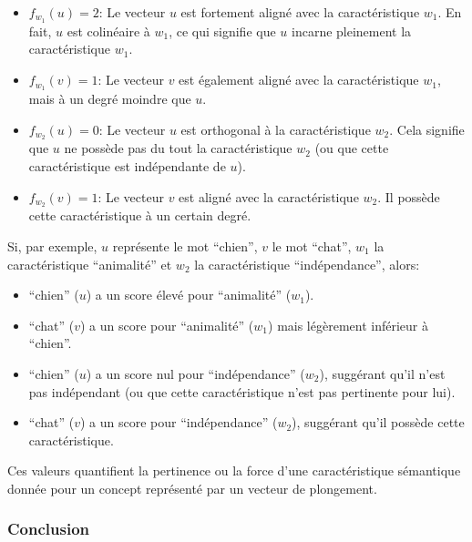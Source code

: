 \documentclass[11pt,a4paper]{report}
\begin{document}
\begin{enumerate}
  \begin{itemize}

  \item
    \(f_{w_1}(u) = 2\): Le vecteur \(u\) est fortement aligné avec la
    caractéristique \(w_1\). En fait, \(u\) est colinéaire à \(w_1\), ce
    qui signifie que \(u\) incarne pleinement la caractéristique
    \(w_1\).
  \item
    \(f_{w_1}(v) = 1\): Le vecteur \(v\) est également aligné avec la
    caractéristique \(w_1\), mais à un degré moindre que \(u\).
  \item
    \(f_{w_2}(u) = 0\): Le vecteur \(u\) est orthogonal à la
    caractéristique \(w_2\). Cela signifie que \(u\) ne possède pas du
    tout la caractéristique \(w_2\) (ou que cette caractéristique est
    indépendante de \(u\)).
  \item
    \(f_{w_2}(v) = 1\): Le vecteur \(v\) est aligné avec la
    caractéristique \(w_2\). Il possède cette caractéristique à un
    certain degré.
  \end{itemize}

  Si, par exemple, \(u\) représente le mot ``chien'', \(v\) le mot
  ``chat'', \(w_1\) la caractéristique ``animalité'' et \(w_2\) la
  caractéristique ``indépendance'', alors:

  \begin{itemize}

  \item
    ``chien'' (\(u\)) a un score élevé pour ``animalité'' (\(w_1\)).
  \item
    ``chat'' (\(v\)) a un score pour ``animalité'' (\(w_1\)) mais
    légèrement inférieur à ``chien''.
  \item
    ``chien'' (\(u\)) a un score nul pour ``indépendance'' (\(w_2\)),
    suggérant qu'il n'est pas indépendant (ou que cette caractéristique
    n'est pas pertinente pour lui).
  \item
    ``chat'' (\(v\)) a un score pour ``indépendance'' (\(w_2\)),
    suggérant qu'il possède cette caractéristique.
  \end{itemize}

  Ces valeurs quantifient la pertinence ou la force d'une
  caractéristique sémantique donnée pour un concept représenté par un
  vecteur de plongement.
\end{enumerate}

\hypertarget{conclusion}{%
\subsubsection{Conclusion}\label{conclusion}}
\end{document}
